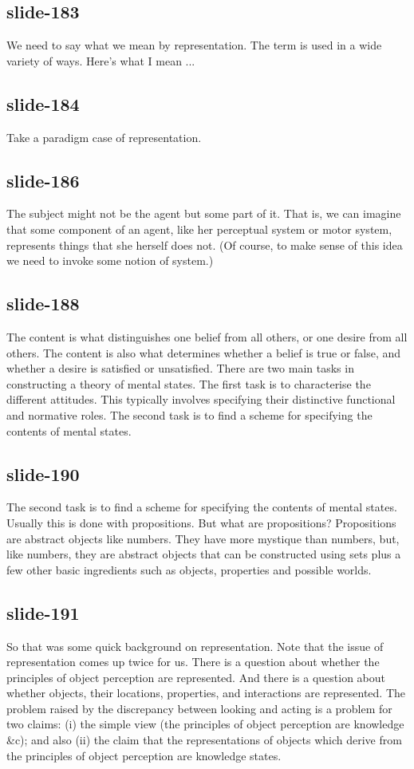 \documentclass[12pt,\papersize]{extarticle}
\begin{document}
 
\subsection{slide-183}
We need to say what we mean by representation.
The term is used in a wide variety of ways.
Here's what I mean ...
 
 
\subsection{slide-184}
Take a paradigm case of representation.
 
 
\subsection{slide-186}
The subject might not be the agent but some part of it.
That is, we can imagine that some component of an agent, like her perceptual system or motor system, represents things that she herself does not.
(Of course, to make sense of this idea we need to invoke some notion of system.)
 
 
\subsection{slide-188}
The content is what distinguishes one belief from all others, or one desire from all others.
The content is also what determines whether a belief is true or false, and whether a desire is satisfied or unsatisfied.
There are two main tasks in constructing a theory of mental states.
The first task is to characterise the different attitudes.
This typically involves specifying their distinctive functional and normative roles.
The second task is to find a scheme for specifying the contents of mental states.
 
 
\subsection{slide-190}
The second task is to find a scheme for specifying the contents of mental states.
Usually this is done with propositions.
But what are propositions?
Propositions are abstract objects like numbers.
They have more mystique than numbers, but, like numbers, they are abstract objects that can be constructed using sets plus a few other basic ingredients such as objects, properties and possible worlds.
 
 
\subsection{slide-191}
So that was some quick background on representation.
Note that the issue of representation comes up twice for us.
There is a question about whether the principles of object perception are represented.
And there is a question about whether objects, their locations, properties, and interactions are represented.
The problem raised by the discrepancy between looking and acting is a problem for two claims: (i) the simple view (the principles of object perception are knowledge \&c); and also (ii) the claim that the representations of objects which derive from the principles of object perception are knowledge states.
 
\end{document}

